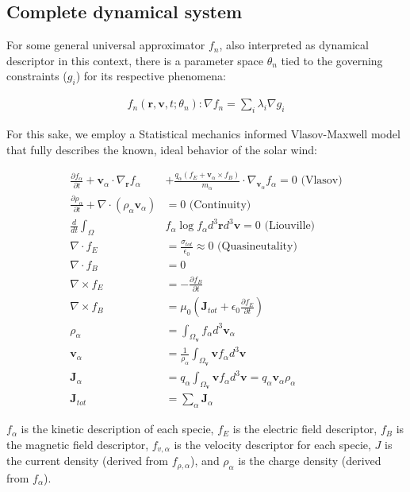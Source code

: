 \documentclass[12pt]{article}
\begin{document}
\subsection{Complete dynamical system}
For some general universal approximator $f_n$, also interpreted as dynamical descriptor in this context, there is a parameter space $\theta_n$ tied to the governing constraints ($g_i$) for its respective phenomena:

\begin{align*}
    f_n(\mathbf{r}, \mathbf{v}, t; \theta_n): \nabla f_n = \sum_{i} \lambda_i \nabla g_i
\end{align*}

For this sake, we employ a Statistical mechanics informed Vlasov-Maxwell model that fully describes the known, ideal behavior of the solar wind:

\begin{align*}
    \frac{\partial f_\alpha}{\partial t} + \mathbf{v}_\alpha \cdot \nabla_{\mathbf{r}} f_\alpha &+ \frac{q_\alpha ( f_E + \mathbf{v}_\alpha \times f_B)}{m_\alpha} \cdot \nabla_{\mathbf{v}_\alpha} f_\alpha = 0 \text{ (Vlasov)}\\
    \frac{\partial \rho_\alpha}{\partial t} + \nabla \cdot \left(\rho_\alpha \mathbf{v}_\alpha \right) &= 0 \text{ (Continuity)}\\
    \frac{d}{dt} \int_\Omega &f_\alpha \log f_\alpha d^3\mathbf{r} d^3\mathbf{v} = 0 \text{ (Liouville)}\\
\nabla \cdot f_E &= \frac{\sigma_{tot}}{\epsilon_0} \approx 0 \text{ (Quasineutality)}\\
\nabla \cdot f_B &= 0 \\
\nabla \times f_E &= - \frac{\partial f_B}{\partial t} \\
\nabla \times f_B &= \mu_0 \left(\mathbf{J}_{tot} + \epsilon_0 \frac{\partial f_E}{\partial t}\right) \\
\rho_\alpha &= \int_{\Omega_\mathbf{v}} f_\alpha d^3 \mathbf{v}_\alpha \\
\mathbf{v}_\alpha &= \frac{1}{\rho_\alpha} \int_{\Omega_\mathbf{v}} \mathbf{v} f_\alpha d^3 \mathbf{v} \\
\mathbf{J}_\alpha &= q_\alpha \int_{\Omega_\mathbf{v}} \mathbf{v} f_\alpha d^3\mathbf{v} = q_\alpha \mathbf{v}_\alpha \rho_\alpha\\
\mathbf{J}_{tot} &= \sum_\alpha \mathbf{J}_\alpha
\end{align*}

$f_\alpha$ is the kinetic description of each specie, $f_E$ is the electric field descriptor, $f_B$ is the magnetic field descriptor, $f_{v, \alpha}$ is the velocity descriptor for each specie, $J$ is the current density (derived from $f_{\rho, \alpha}$), and $\rho_\alpha$ is the charge density (derived from $f_\alpha$).
\end{document}
